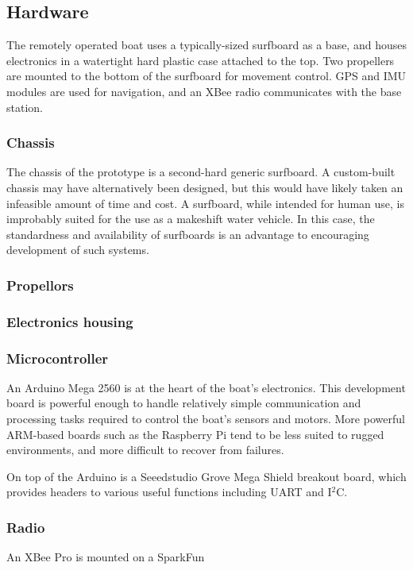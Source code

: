 \documentclass[a4paper]{IEEEtran}
\begin{document}

\subsection{Hardware}
The remotely operated boat uses a typically-sized surfboard as a base, and houses electronics in a watertight hard plastic case attached to the top. Two propellers are mounted to the bottom of the surfboard for movement control. GPS and IMU modules are used for navigation, and an XBee radio communicates with the base station.

\subsubsection{Chassis}
The chassis of the prototype is a second-hard generic surfboard. A custom-built chassis may have alternatively been designed, but this would have likely taken an infeasible amount of time and cost. A surfboard, while intended for human use, is improbably suited for the use as a makeshift water vehicle. In this case, the standardness and availability of surfboards is an advantage to encouraging development of such systems.

\subsubsection{Propellors}

\subsubsection{Electronics housing}

\subsubsection{Microcontroller}
An Arduino Mega 2560 is at the heart of the boat's electronics. This development board is powerful enough to handle relatively simple communication and processing tasks required to control the boat's sensors and motors. More powerful ARM-based boards such as the Raspberry Pi tend to be less suited to rugged environments, and more difficult to recover from failures.

On top of the Arduino is a Seeedstudio Grove Mega Shield breakout board, which provides headers to various useful functions including UART and I$^2$C. 

\subsubsection{Radio}
An XBee Pro is mounted on a SparkFun
\end{document}
